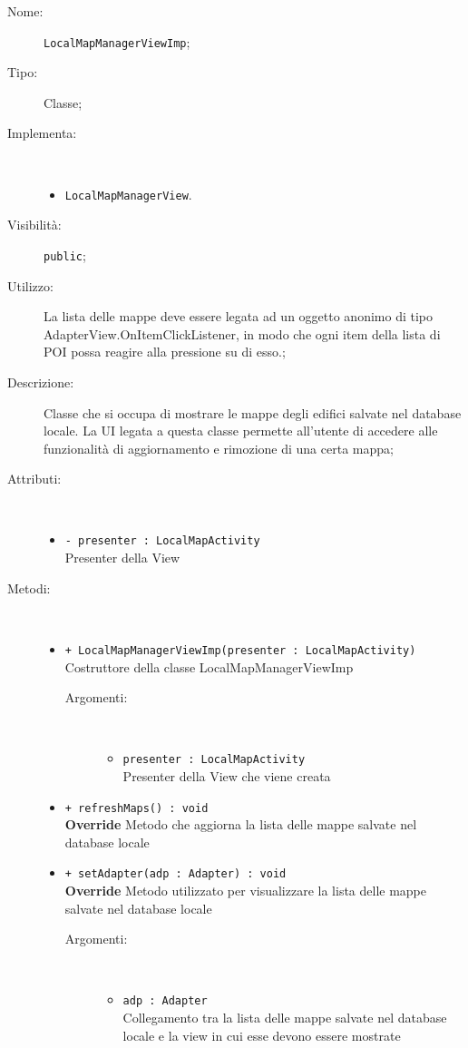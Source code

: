 \documentclass[../DefinizioneDiProdotto.tex]{subfiles}
\begin{document}
    \begin{description}
\item[Nome:] \texttt{LocalMapManagerViewImp};
\item[Tipo:] Classe;
\item[Implementa:] \
\begin{itemize}
\item \texttt{LocalMapManagerView}.

\end{itemize}
\item[Visibilità:] \texttt{public};
\item[Utilizzo:] La lista delle mappe deve essere legata ad un oggetto anonimo di tipo AdapterView.OnItemClickListener, in modo che ogni item della lista di POI possa reagire alla pressione su di esso.;
\item[Descrizione:] Classe che si occupa di mostrare le mappe degli edifici salvate nel database locale. La UI legata a questa classe permette all'utente di accedere alle funzionalità di aggiornamento e rimozione di una certa mappa;
\item[Attributi:] \
\begin{itemize}
\item \texttt{- presenter : LocalMapActivity}\\
Presenter della View

\end{itemize}
\item[Metodi:] \
\begin{itemize}
\item \texttt{+ LocalMapManagerViewImp(presenter : LocalMapActivity)}\\
Costruttore della classe LocalMapManagerViewImp
 \begin{description}
\item[Argomenti:] \
\begin{itemize}
\item \texttt{presenter : LocalMapActivity}\\
Presenter della View che viene creata\end{itemize}
\end{description}
\item \texttt{+ refreshMaps() : void}\\
\textbf{Override} Metodo che aggiorna la lista delle mappe salvate nel database locale
 \item \texttt{+ setAdapter(adp : Adapter) : void}\\
\textbf{Override} Metodo utilizzato per visualizzare la lista delle mappe salvate nel database locale
 \begin{description}
\item[Argomenti:] \
\begin{itemize}
\item \texttt{adp : Adapter}\\
Collegamento tra la lista delle mappe salvate nel database locale e la view in cui esse devono essere mostrate\end{itemize}
\end{description}
\end{itemize}
\end{description}
\end{document}

